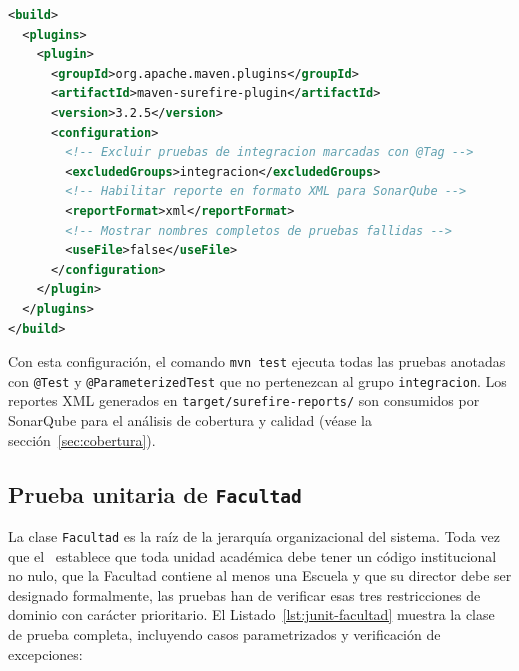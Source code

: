 \begin{lstlisting}[style=javaStyle,
  caption={Configuración de Maven Surefire para JUnit~5 en \texttt{pom.xml}.},
  label={lst:surefire-config},
  language=XML]
<build>
  <plugins>
    <plugin>
      <groupId>org.apache.maven.plugins</groupId>
      <artifactId>maven-surefire-plugin</artifactId>
      <version>3.2.5</version>
      <configuration>
        <!-- Excluir pruebas de integracion marcadas con @Tag -->
        <excludedGroups>integracion</excludedGroups>
        <!-- Habilitar reporte en formato XML para SonarQube -->
        <reportFormat>xml</reportFormat>
        <!-- Mostrar nombres completos de pruebas fallidas -->
        <useFile>false</useFile>
      </configuration>
    </plugin>
  </plugins>
</build>
\end{lstlisting}

\noindent
Con esta configuración, el comando \texttt{mvn test} ejecuta todas las pruebas anotadas con
\texttt{@Test} y \texttt{@ParameterizedTest} que no pertenezcan al grupo \texttt{integracion}.
Los reportes XML generados en \texttt{target/surefire-reports/} son consumidos por SonarQube
para el análisis de cobertura y calidad (véase la sección~\ref{sec:cobertura}).

\subsection{Prueba unitaria de \texttt{Facultad}}
\label{subsec:prueba-facultad}

La clase \texttt{Facultad} es la raíz de la jerarquía organizacional del sistema.
Toda vez que el \acuerdo\ establece que toda unidad académica debe tener un código
institucional no nulo, que la Facultad contiene al menos una Escuela y que su director
debe ser designado formalmente, las pruebas han de verificar esas tres restricciones
de dominio con carácter prioritario. El Listado~\ref{lst:junit-facultad} muestra la
clase de prueba completa, incluyendo casos parametrizados y verificación de excepciones:

